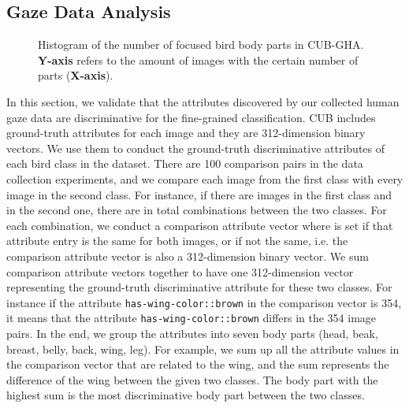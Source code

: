 \documentclass{bmvc2k}
\begin{document}
\subsection{Gaze Data Analysis}

\begin{figure}[t]
    \centering
    \vspace{0.2cm}
    \caption{Histogram of the number of focused bird body parts in CUB-GHA. \textbf{Y-axis} refers to the amount of images with the certain number of parts (\textbf{X-axis}).}
    \label{fig:bar chart}
\end{figure}

In this section, we validate that the attributes discovered by our collected human gaze data are discriminative for the fine-grained classification. CUB includes ground-truth attributes for each image and they are 312-dimension binary vectors.
We use them to conduct the ground-truth discriminative attributes of each bird class in the dataset. There are 100 comparison pairs in the data collection experiments, and we compare each image from the first class with every image in the second class. For instance, if there are  images in the first class and  in the second one, there are in total  combinations between the two classes. For each combination, we conduct a comparison attribute vector where  is set if that attribute entry is the same for both images, or  if not the same, i.e. the comparison attribute vector is also a 312-dimension binary vector. We sum  comparison attribute vectors together to have one 312-dimension vector representing the ground-truth discriminative attribute for these two classes. For instance if the attribute \texttt{has-wing-color::brown} in the comparison vector is 354, it means that the attribute \texttt{has-wing-color::brown} differs in the 354 image pairs. In the end, we group the attributes into seven body parts (head, beak, breast, belly, back, wing, leg). For example, we sum up all the attribute values in the comparison vector that are related to the wing, and the sum represents the difference of the wing between the given two classes. The body part with the highest sum is the most discriminative body part between the two classes.
\end{document}
